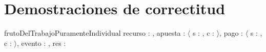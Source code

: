\documentclass[10pt,a4paper]{article}
\begin{document}
\section{Demostraciones de correctitud}
\begin{proc}{frutoDelTrabajoPuramenteIndividual}{
    \In recurso : \float,
    \In apuesta : $\langle$ s : \float, c : \float $\rangle$, 
    \In pago : $\langle$ s : \float, c : \float $\rangle$,
    \In evento : \TLista{\bool},
    \Out res : \float
}{}
\end{proc}

\end{document}
